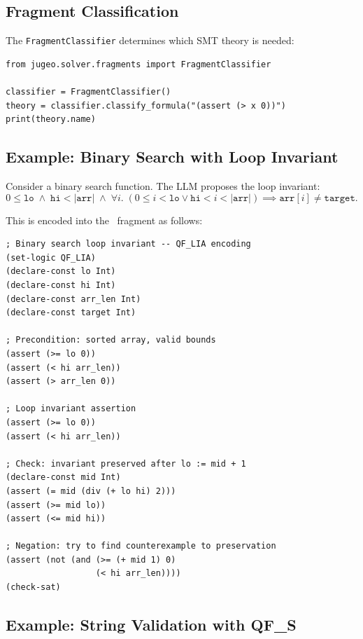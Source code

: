 \documentclass[11pt]{article}
\begin{document}
\subsection{Fragment Classification}

The \texttt{FragmentClassifier} determines which SMT theory is needed:

\begin{lstlisting}[style=jugeo-python]
from jugeo.solver.fragments import FragmentClassifier

classifier = FragmentClassifier()
theory = classifier.classify_formula("(assert (> x 0))")
print(theory.name)
\end{lstlisting}

\subsection{Example: Binary Search with Loop Invariant}

Consider a binary search function.  The LLM proposes the loop invariant:
\[
  0 \le \mathtt{lo} \;\land\; \mathtt{hi} < |\mathtt{arr}|
  \;\land\; \forall i.\; (0 \le i < \mathtt{lo} \lor \mathtt{hi} < i < |\mathtt{arr}|)
  \implies \mathtt{arr}[i] \ne \mathtt{target}.
\]

This is encoded into the \QFLIA\ fragment as follows:

\begin{lstlisting}[style=jugeo-output]
; Binary search loop invariant -- QF_LIA encoding
(set-logic QF_LIA)
(declare-const lo Int)
(declare-const hi Int)
(declare-const arr_len Int)
(declare-const target Int)

; Precondition: sorted array, valid bounds
(assert (>= lo 0))
(assert (< hi arr_len))
(assert (> arr_len 0))

; Loop invariant assertion
(assert (>= lo 0))
(assert (< hi arr_len))

; Check: invariant preserved after lo := mid + 1
(declare-const mid Int)
(assert (= mid (div (+ lo hi) 2)))
(assert (>= mid lo))
(assert (<= mid hi))

; Negation: try to find counterexample to preservation
(assert (not (and (>= (+ mid 1) 0)
                  (< hi arr_len))))
(check-sat)
\end{lstlisting}

\subsection{Example: String Validation with QF\_S}
\end{document}
